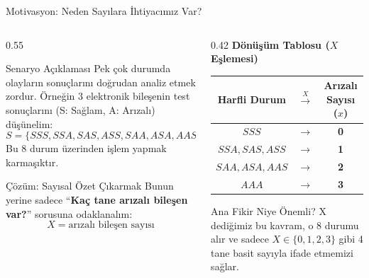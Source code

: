 ﻿\documentclass[light]{lutbeamer}
\begin{document}

\begin{frame}{Motivasyon: Neden Sayılara İhtiyacımız Var?}
\footnotesize
\begin{columns}[T]
  \begin{column}{0.55\textwidth}
    \begin{block}{Senaryo Açıklaması}
      Pek çok durumda olayların sonuçlarını doğrudan analiz etmek zordur. Örneğin 3 elektronik bileşenin test sonuçlarını (S: Sağlam, A: Arızalı) düşünelim:
      \[
      S = \{SSS, SSA, SAS, ASS, SAA, ASA, AAS, AAA\}
      \]
      Bu 8 durum üzerinden işlem yapmak karmaşıktır.
    \end{block}

    \begin{block}{Çözüm: Sayısal Özet Çıkarmak}
      Bunun yerine sadece ``\textbf{Kaç tane arızalı bileşen var?}'' sorusuna odaklanalım:
      \[
      X = \text{arızalı bileşen sayısı}
      \] 
    \end{block}
  \end{column}
  \begin{column}{0.42\textwidth}
    \centering
    \textbf{Dönüşüm Tablosu ($X$ Eşlemesi)}
    \vspace{0.15cm}
    
    \begin{tabular}{c c c}
      \toprule
      Harfli Durum & $\xrightarrow{X}$ & Arızalı Sayısı ($x$) \\
      \midrule
      $SSS$ & $\rightarrow$ & \textbf{0} \\
      $SSA, SAS, ASS$ & $\rightarrow$ & \textbf{1} \\
      $SAA, ASA, AAS$ & $\rightarrow$ & \textbf{2} \\
      $AAA$ & $\rightarrow$ & \textbf{3} \\
      \bottomrule
    \end{tabular}
    
    \vspace{0.4cm}
    \begin{alertblock}{Ana Fikir Niye Önemli?}
      X dediğimiz bu kavram, o 8 durumu alır ve sadece $X \in \{0, 1, 2, 3\}$ gibi 4 tane basit sayıyla ifade etmemizi sağlar.
    \end{alertblock}
  \end{column}
\end{columns}
\end{frame}
\end{document}
